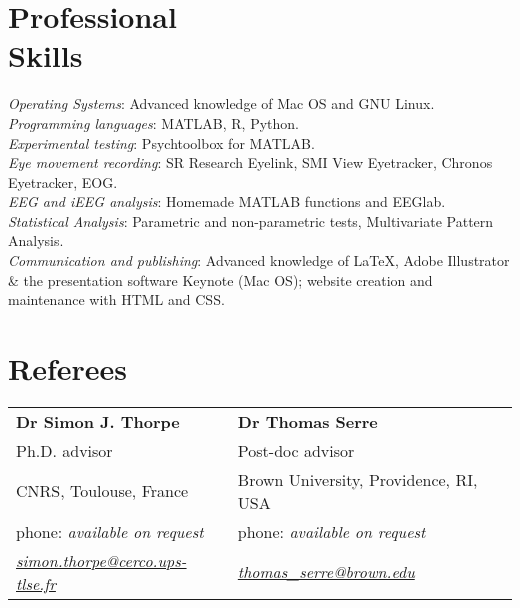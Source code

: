 \documentclass[margin,line]{resume}
\begin{document}
\begin{resume}


	\vspace{3mm}
    \section{\mysidestyle Professional\\Skills}
	\textsl{Operating Systems}: Advanced knowledge of Mac OS and GNU Linux.\\
	\textsl{Programming languages}: MATLAB, R, Python.\\
	\textsl{Experimental testing}: Psychtoolbox for MATLAB.\\
	\textsl{Eye movement recording}: SR Research Eyelink, SMI View Eyetracker, Chronos Eyetracker, EOG.\\
	\textsl{EEG and iEEG analysis}: Homemade MATLAB functions and EEGlab.\\
	\textsl{Statistical Analysis}: Parametric and non-parametric tests, Multivariate Pattern Analysis.\\
	\textsl{Communication and publishing}: Advanced knowledge of \LaTeX, Adobe Illustrator \& the presentation software Keynote (Mac OS); website creation and maintenance with HTML and CSS.


\newpage

	\section{\mysidestyle Referees} 

	\begin{tabular}{@{}p{6cm}p{6cm}}
	\textbf{Dr Simon J. Thorpe}       &  \textbf{Dr Thomas Serre}                   \\
	Ph.D. advisor                               &  Post-doc advisor                       \\
	CNRS, Toulouse, France          &  Brown University, Providence, RI, USA        \\
	phone: \textsl{available on request}    &  phone: \textsl{available on request}     \\
	\textsl{\href{mailto:simon.thorpe@cerco.ups-tlse.fr}{simon.thorpe@cerco.ups-tlse.fr}}   &  
	\textsl{\href{mailto:thomas_serre@brown.edu}{thomas\_serre@brown.edu}}    \\
	\end{tabular}
	

\end{resume}
\end{document}
